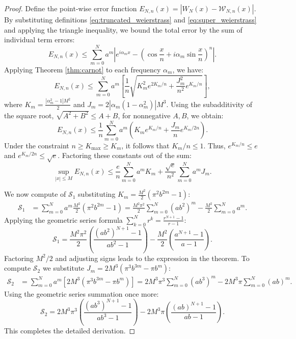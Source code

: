 \documentclass[reqno,11pt]{amsart}
\theoremstyle{definition}
\begin{document}
\begin{proof}
Define the point-wise error function $E_{N,n}(x) = |W_N(x) - \mathcal{W}_{N,n}(x)|$. By substituting definitions \eqref{eq:truncated_weierstrass} and \eqref{eq:super_weierstrass} and applying the triangle inequality, we bound the total error by the sum of individual term errors:
\begin{equation} \label{eq:triangle_step}
    E_{N,n}(x) \leq \sum_{m=0}^{N} a^m \left| e^{i \alpha_m x} - \left( \cos\frac{x}{n} + i \alpha_m \sin\frac{x}{n} \right)^n \right|.
\end{equation}
Applying Theorem \ref{thm:carnot} to each frequency $\alpha_m$, we have:
\[
    E_{N,n}(x) \leq \sum_{m=0}^{N} a^m \left[ \frac{1}{n} \sqrt{ K_m^2 e^{2K_m/n} + \frac{J_m^2}{n^2} e^{K_m/n} } \right],
\]
where $K_m = \frac{|\alpha_m^2-1|M^2}{2}$ and $J_m = 2|\alpha_m(1-\alpha_m^2)|M^3$.
Using the subadditivity of the square root, $\sqrt{A^2 + B^2} \leq A + B$, for nonnegative $A,B$, we obtain:
\[
    E_{N,n}(x) \leq \frac{1}{n} \sum_{m=0}^{N} a^m \left( K_m e^{K_m/n} + \frac{J_m}{n} e^{K_m/2n} \right).
\]
Under the constraint $n \ge K_{\max} \ge K_m$, it follows that $K_m/n \le 1$. Thus, $e^{K_m/n} \le e$ and $e^{K_m/2n} \le \sqrt{e}$. Factoring these constants out of the sum:
\[
    \sup_{|x|\le M} E_{N,n}(x) \leq \frac{e}{n} \sum_{m=0}^{N} a^m K_m + \frac{\sqrt{e}}{n^2} \sum_{m=0}^{N} a^m J_m.
\]

We now compute of $\mathcal{S}_1$ substituting $K_m = \frac{M^2}{2}(\pi^2 b^{2m} - 1)$:
\begin{align*}
    \mathcal{S}_1 &= \sum_{m=0}^{N} a^m \frac{M^2}{2}(\pi^2 b^{2m} - 1) = \frac{M^2 \pi^2}{2} \sum_{m=0}^{N} (ab^2)^m - \frac{M^2}{2} \sum_{m=0}^{N} a^m.
\end{align*}
Applying the geometric series formula $\sum_{k=0}^N r^k = \frac{r^{N+1}-1}{r-1}$:
\[
    \mathcal{S}_1 = \frac{M^2 \pi^2}{2} \left( \frac{(ab^2)^{N+1}-1}{ab^2-1} \right) - \frac{M^2}{2} \left( \frac{a^{N+1}-1}{a-1} \right).
\]
Factoring $M^2/2$ and adjusting signs leads to the expression in the theorem.
To compute $\mathcal{S}_2$ we
substitute  $J_m = 2M^3(\pi^3 b^{3m} - \pi b^m)$:
\begin{align*}
    \mathcal{S}_2 &= \sum_{m=0}^{N} a^m [ 2M^3 (\pi^3 b^{3m} - \pi b^m) ] = 2M^3 \pi^3 \sum_{m=0}^{N} (ab^3)^m - 2M^3 \pi \sum_{m=0}^{N} (ab)^m.
\end{align*}
Using the geometric series summation once more:
\[
    \mathcal{S}_2 = 2M^3 \pi^3 \left( \frac{(ab^3)^{N+1}-1}{ab^3-1} \right) - 2M^3 \pi \left( \frac{(ab)^{N+1}-1}{ab-1} \right).
\]
This completes the detailed derivation.
\end{proof}
\end{document}
